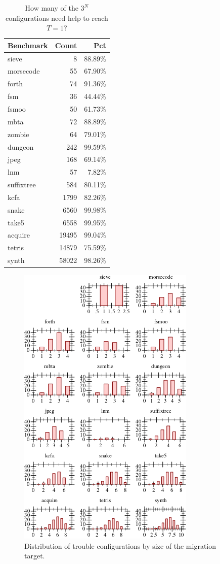 \begin{table}[t]
  \caption{How many of the $3^N$ configurations need help to reach $T=1$?}
  \label{t:baseline-trouble}
  \begin{tabular}{lrr}
    Benchmark  & Count & Pct \\\midrule
    sieve      & 8     & 88.89\% \\
    morsecode  & 55    & 67.90\% \\
    forth      & 74    & 91.36\% \\
    fsm        & 36    & 44.44\% \\
    fsmoo      & 50    & 61.73\% \\
    mbta       & 72    & 88.89\% \\
    zombie     & 64    & 79.01\% \\
    dungeon    & 242   & 99.59\% \\
    jpeg       & 168   & 69.14\% \\
    lnm        & 57    &  7.82\% \\
    suffixtree & 584   & 80.11\% \\
    kcfa       & 1799  & 82.26\% \\
    snake      & 6560  & 99.98\% \\
    take5      & 6558  & 99.95\% \\
    acquire    & 19495 & 99.04\% \\
    tetris     & 14879 & 75.59\% \\
    synth      & 58022 & 98.26\% \\
  \end{tabular}

\end{table}

\begin{figure}[t]
  \caption{Distribution of trouble configurations by size of the migration target.}
  \label{f:where-trouble}
  \includegraphics{data/where-trouble.pdf}
\end{figure}


